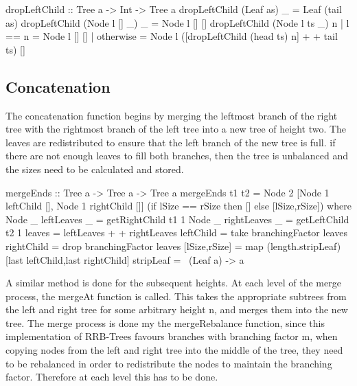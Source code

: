 \documentclass[11pt,a4paper,oneside]{article}
\begin{document}
\begin{haskell}

dropLeftChild :: Tree a -> Int -> Tree a
dropLeftChild (Leaf as) _      = Leaf (tail as)
dropLeftChild (Node l [] _) _ = Node l [] []
dropLeftChild (Node l ts _) n | l == n = Node l [] []
                              | otherwise = Node l ([dropLeftChild (head ts) n] + + tail ts) []

\end{haskell}

\subsection{Concatenation}

The concatenation function begins by merging the leftmost branch of the right tree with the rightmost branch of the left tree into a new tree of height two. The leaves are redistributed to ensure that the left branch of the new tree is full. if there are not enough leaves to fill both branches, then the tree is unbalanced and the sizes need to be calculated and stored.

\begin{haskell}

mergeEnds :: Tree a -> Tree a -> Tree a
mergeEnds t1 t2 = Node 2 [Node 1 leftChild [], Node 1 rightChild []] (if lSize == rSize then [] else [lSize,rSize])
        where Node _ leftLeaves _  = getRightChild t1 1
              Node _ rightLeaves _ = getLeftChild t2 1
              leaves        = leftLeaves + + rightLeaves
              leftChild     = take branchingFactor leaves
              rightChild    = drop branchingFactor leaves
              [lSize,rSize] = map (length.stripLeaf) [last leftChild,last rightChild]
              stripLeaf     = \ (Leaf a) -> a

\end{haskell}

A similar method is done for the subsequent heights. At each level of the merge process, the mergeAt function is called. This takes the appropriate subtrees from the left and right tree for some arbitrary height n, and merges them into the new tree. The merge process is done my the mergeRebalance function, since this implementation of RRB-Trees favours branches with branching factor m, when copying nodes from the left and right tree into the middle of the tree, they need to be rebalanced in order to redistribute the nodes to maintain the branching factor. Therefore at each level this has to be done.
\end{document}
